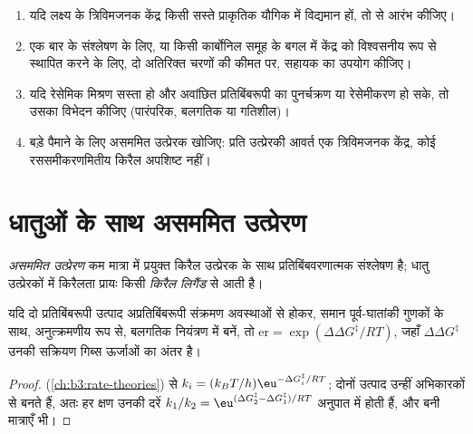 \begin{method}\label{met:b3:asymmetric-synthesis:strategy}
\begin{enumerate}
  \item यदि लक्ष्य के त्रिविमजनक केंद्र किसी सस्ते प्राकृतिक यौगिक में विद्यमान हों, तो
         से आरंभ कीजिए।
  \item एक बार के संश्लेषण के लिए, या किसी कार्बोनिल समूह के बगल में केंद्र को विश्वसनीय रूप से स्थापित करने के लिए,
        दो अतिरिक्त चरणों की कीमत पर, सहायक का उपयोग कीजिए।
  \item यदि रेसेमिक मिश्रण सस्ता हो और अवांछित प्रतिबिंबरूपी का पुनर्चक्रण या
        रेसेमीकरण हो सके, तो उसका विभेदन कीजिए (पारंपरिक, बलगतिक या गतिशील)।
  \item बड़े पैमाने के लिए असममित उत्प्रेरक खोजिए: प्रति उत्प्रेरकी आवर्त एक त्रिविमजनक केंद्र,
        कोई रससमीकरणमितीय किरैल अपशिष्ट नहीं।
\end{enumerate}
\end{method}

\section{धातुओं के साथ असममित उत्प्रेरण}

\begin{definition}[असममित उत्प्रेरण]\label{def:b3:asymmetric-synthesis:asymmetric-catalysis}
\emph{असममित उत्प्रेरण} कम मात्रा में प्रयुक्त किरैल उत्प्रेरक के साथ
प्रतिबिंबवरणात्मक संश्लेषण है; धातु उत्प्रेरकों में
किरैलता प्रायः किसी \emph{किरैल लिगैंड} से आती है।
\end{definition}

\begin{theorem}\label{thm:b3:asymmetric-synthesis:er-ddg}
यदि दो प्रतिबिंबरूपी उत्पाद अप्रतिबिंबरूपी संक्रमण अवस्थाओं से होकर,
समान पूर्व-घातांकी गुणकों के साथ, अनुत्क्रमणीय रूप से, बलगतिक नियंत्रण में बनें, तो
$\mathrm{er} = \exp(\Delta\Delta G^\ddagger/RT)$, जहाँ $\Delta\Delta G^\ddagger$ उनकी सक्रियण गिब्स ऊर्जाओं का
अंतर है।
\end{theorem}

\begin{proof}
 (\cref{ch:b3:rate-theories}) से
$k_i = (k_BT/h)\eu^{-\Delta G_i^\ddagger/RT}$; दोनों उत्पाद उन्हीं अभिकारकों से बनते हैं, अतः हर क्षण
उनकी दरें $k_1/k_2 = \eu^{(\Delta G_2^\ddagger - \Delta G_1^\ddagger)/RT}$ अनुपात में होती हैं, और बनी मात्राएँ भी।
\end{proof}

